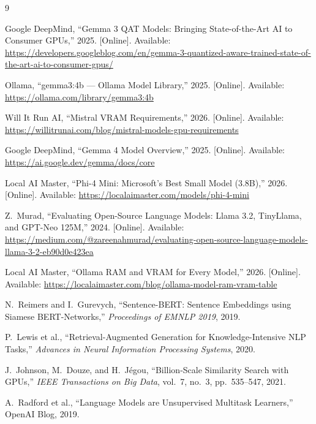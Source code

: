\documentclass[10pt,conference]{IEEEtran}
\begin{document}
\begin{thebibliography}{9}

{Google DeepMind},
``Gemma 3 QAT Models: Bringing State-of-the-Art AI to Consumer GPUs,''
2025. [Online]. Available:
\url{https://developers.googleblog.com/en/gemma-3-quantized-aware-trained-state-of-the-art-ai-to-consumer-gpus/}

{Ollama}, ``gemma3:4b --- Ollama Model Library,'' 2025.
[Online]. Available: \url{https://ollama.com/library/gemma3:4b}

{Will It Run AI}, ``Mistral VRAM Requirements,'' 2026.
[Online]. Available:
\url{https://willitrunai.com/blog/mistral-models-gpu-requirements}

{Google DeepMind}, ``Gemma 4 Model Overview,'' 2025.
[Online]. Available: \url{https://ai.google.dev/gemma/docs/core}

{Local AI Master}, ``Phi-4 Mini: Microsoft's Best Small Model
(3.8B),'' 2026. [Online]. Available:
\url{https://localaimaster.com/models/phi-4-mini}

Z.~Murad, ``Evaluating Open-Source Language Models: Llama 3.2,
TinyLlama, and GPT-Neo 125M,'' 2024. [Online]. Available:
\url{https://medium.com/@zareenahmurad/evaluating-open-source-language-models-llama-3-2-eb90d0e423ea}

{Local AI Master}, ``Ollama RAM and VRAM for Every Model,''
2026. [Online]. Available:
\url{https://localaimaster.com/blog/ollama-model-ram-vram-table}

N.~Reimers and I.~Gurevych,
``Sentence-BERT: Sentence Embeddings using Siamese
BERT-Networks,'' \textit{Proceedings of EMNLP 2019}, 2019.

P.~Lewis et al.,
``Retrieval-Augmented Generation for Knowledge-Intensive NLP
Tasks,'' \textit{Advances in Neural Information Processing
Systems}, 2020.

J.~Johnson, M.~Douze, and H.~J\'{e}gou,
``Billion-Scale Similarity Search with GPUs,''
\textit{IEEE Transactions on Big Data}, vol.~7, no.~3,
pp.~535--547, 2021.

A.~Radford et al.,
``Language Models are Unsupervised Multitask Learners,''
OpenAI Blog, 2019.

\end{thebibliography}
\end{document}
